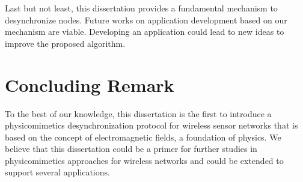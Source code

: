 Last but not least, this dissertation provides a fundamental mechanism to desynchronize nodes. Future works on application development based on our mechanism are viable. Developing an application could lead to new ideas to improve the proposed algorithm.

\section{Concluding Remark}
To the best of our knowledge, this dissertation is the first to introduce a physicomimetics desynchronization protocol for wireless sensor networks that is based on the concept of electromagnetic fields, a foundation of physics. We believe that this dissertation could be a primer for further studies in physicomimetics approaches for wireless networks and could be extended to support several applications.
